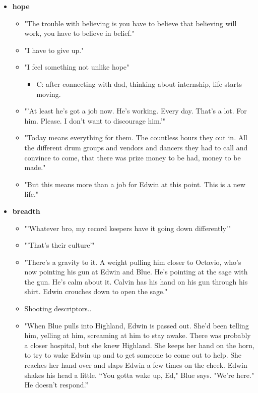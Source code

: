 \documentclass[letterpaper]{article}
\begin{document}
\begin{itemize}
\item \textbf{hope}

\begin{itemize}
\item "The trouble with believing is you have to believe that believing
will work, you have to believe in belief."
\item "I have to give up."
\item "I feel something not unlike hope"

\begin{itemize}
\item C: after connecting with dad, thinking about internship, life
starts moving.
\end{itemize}

\item "'At least he's got a job now. He's working. Every day. That's a
lot. For him. Please. I don't want to discourage him.'"
\item "Today means everything for them. The countless hours they out in.
All the different drum groups and vendors and dancers they had to
call and convince to come, that there was prize money to be had,
money to be made."
\item "But this means more than a job for Edwin at this point. This is a
new life."
\end{itemize}

\item \textbf{breadth}

\begin{itemize}
\item "'Whatever bro, my record keepers have it going down differently'"
\item "'That's their culture'"
\item "There's a gravity to it. A weight pulling him closer to Octavio,
who's now pointing his gun at Edwin and Blue. He's pointing at the
sage with the gun. He's calm about it. Calvin has his hand on his
gun through his shirt. Edwin crouches down to open the sage."
\item Shooting descriptors..
\item "When Blue pulls into Highland, Edwin is passed out. She'd been
telling him, yelling at him, screaming at him to stay awake. There
was probably a closer hospital, but she knew Highland. She keeps her
hand on the horn, to try to wake Edwin up and to get someone to come
out to help. She reaches her hand over and slaps Edwin a few times
on the cheek. Edwin shakes his head a little. “You gotta wake up,
Ed," Blue says. "We're here." He doesn't respond.”
\end{itemize}
\end{itemize}
\end{document}
